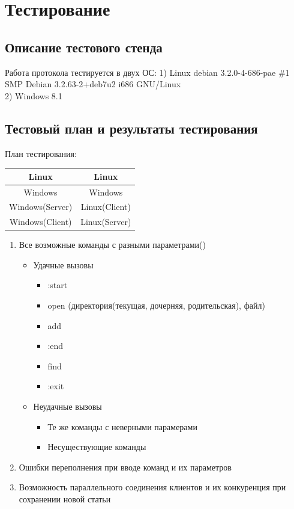 \documentclass[12pt,a4paper]{report}
\begin{document}
 \FloatBarrier
\section{Тестирование}
\subsection{Описание тестового стенда}
Работа протокола тестируется в двух ОС:
1) Linux debian 3.2.0-4-686-pae \#1 SMP Debian 3.2.63-2+deb7u2 i686 GNU/Linux\\
2) Windows 8.1
\subsection{Тестовый план и результаты тестирования}
План тестирования:

\begin{tabular}{|c|c|}
\hline 
Linux & Linux \\ 
\hline 
Windows & Windows \\ 
\hline 
Windows(Server) & Linux(Client) \\ 
\hline 
Windows(Client) & Linux(Server) \\ 
\hline 
\end{tabular} 


\begin{enumerate}
\item Все возможные команды с разными параметрами()
\begin{itemize}
\item Удачные вызовы
\begin{itemize}
\item :start
\item open (директория(текущая, дочерняя, родительская), файл)
\item  add
\item  :end
\item  find
\item  :exit
\end{itemize}
\item Неудачные вызовы
\begin{itemize}
\item Те же команды с неверными парамерами
\item Несуществующие команды
\end{itemize}
\end{itemize}
\item Ошибки переполнения при вводе команд и их параметров
\item Возможность параллельного соединения клиентов и их конкуренция при сохранении новой статьи
\end{enumerate}
\end{document}

